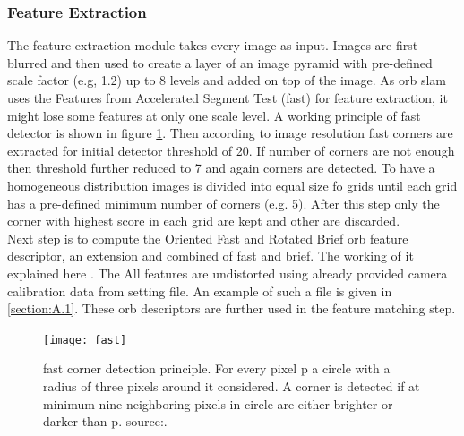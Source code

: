 \subsubsection{Feature Extraction}
The feature extraction module takes every image as input. Images are first blurred and then used to create a layer of an image pyramid with pre-defined scale factor (e.g, 1.2) up to 8 levels and added on top of the image. As \acrshort{orb} \acrshort{slam} uses the Features from Accelerated Segment Test (\acrshort{fast}) for feature extraction, it might lose some features at only one scale level. A working principle of \acrshort{fast} detector is shown in figure \ref{fig:fast}.
Then according to image resolution \acrshort{fast} corners are extracted for initial detector threshold of 20. If number of corners are not enough then threshold further reduced to 7 and again corners are detected. To have a homogeneous distribution images is divided into equal size fo grids until each grid has a pre-defined minimum number of corners (e.g. 5). After this step only the corner with highest score in each grid are kept and other are discarded. \\
\linebreak
Next step is to compute the Oriented Fast and Rotated Brief \acrshort{orb} feature descriptor, an extension and combined of \acrshort{fast} and \acrshort{brief}. The working of it explained here \cite{ORB}. The All features are undistorted using already provided camera calibration data from setting file. An example of such a file is given in \ref{section:A.1}. These \acrshort{orb} descriptors are further used in the feature matching step.
\begin{figure}[h]
	\centering
	\texttt{[image: fast]}
	\caption{\acrshort{fast} corner detection principle. For every pixel {p} a circle with
		a radius of three pixels around it considered. A corner is detected if at minimum nine neighboring pixels in circle are either brighter or darker than {p}. source:\cite{fast}.}
	\label{fig:fast}
\end{figure}

